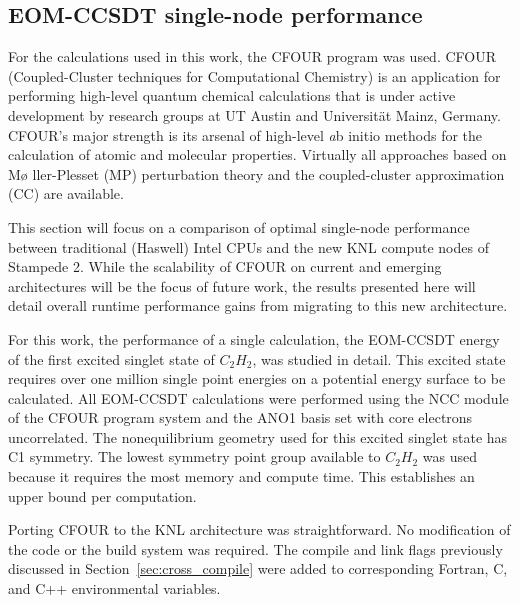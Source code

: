\subsection{EOM-CCSDT single-node performance}
\label{sec:cfour}

For the calculations used in this work,
the CFOUR \cite{cfour:08} program was used. CFOUR
(Coupled-Cluster techniques for Computational Chemistry) is an
application for performing high-level quantum chemical calculations
that is under active development by research groups at UT Austin and
Universit\"{a}t Mainz, Germany. CFOUR's major strength is its arsenal
of high-level {\emph ab initio} methods for the calculation of atomic and
molecular properties.  Virtually all approaches based on M\o
ller-Plesset (MP) perturbation theory and the coupled-cluster
approximation (CC) are available.

This section will focus on a comparison of optimal single-node performance
between traditional (Haswell) Intel CPUs and the new KNL compute nodes of Stampede 2.
While the scalability of CFOUR on current and emerging architectures will be the focus 
of future work, the results presented here will detail overall runtime performance gains
from migrating to this new architecture. 

For this work, the performance of a single calculation, the EOM-CCSDT energy of the first
excited singlet state of $C_2H_2$, was studied in detail\cite{}. 
This excited state requires over one million single point
energies on a potential energy surface to be calculated. 
All EOM-CCSDT calculations were performed 
using the NCC module\cite{ncc:15} of the CFOUR program system and the ANO1 basis set\cite{ano1:87} with core 
electrons uncorrelated. The nonequilibrium geometry used for this excited singlet state has C1 symmetry. 
The lowest symmetry point group available to $C_2H_2$ was used because it requires the most memory 
and compute time. This establishes an upper bound per computation.

Porting CFOUR to the KNL architecture was straightforward. No modification of the code or the build
system was required. The compile and link flags previously discussed in Section~\ref{sec:cross_compile}
were added to corresponding Fortran, C, and C++ environmental variables.

